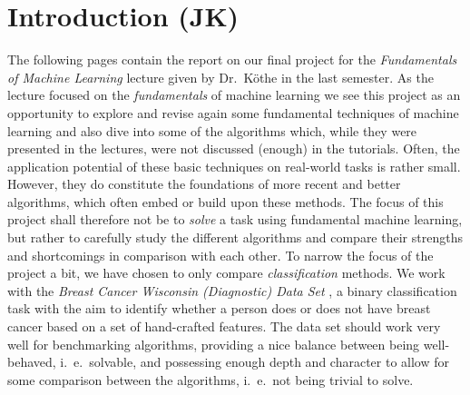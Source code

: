 \documentclass[12pt, a4paper]{scrartcl}
\begin{document}
\tableofcontents
\pagebreak




\section{Introduction (JK)}
The following pages contain the report on our final project for the \emph{Fundamentals of Machine Learning} lecture given by Dr.\ Köthe in the last semester. As the lecture focused on the \emph{fundamentals} of machine learning we see this project as an opportunity to explore and revise again some fundamental techniques of machine learning and also dive into some of the algorithms which, while they were presented in the lectures, were not discussed (enough) in the tutorials.  Often, the application potential of these basic techniques on real-world tasks is rather small. However, they do constitute the foundations of more recent and better algorithms, which often embed or build upon these methods. 
The focus of this project shall therefore not be to \emph{solve} a task using fundamental machine learning, but rather to carefully study the different algorithms and compare their strengths and shortcomings in comparison with each other. To narrow the focus of the project a bit, we have chosen to only compare \emph{classification} methods.
We work with the \emph{Breast Cancer Wisconsin (Diagnostic) Data Set} \cite{street1993nuclear}, a binary classification task with the aim to identify whether a person does or does not have breast cancer based on a set of hand-crafted features. The data set should work very well for benchmarking algorithms, providing a nice balance between being well-behaved, i.\ e.\ solvable, and possessing enough depth and character to allow for some comparison between the algorithms, i.\ e.\ not being trivial to solve.
\end{document}
